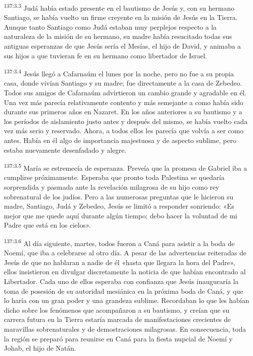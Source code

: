 \par
\textsuperscript{137:3.3} Judá había estado presente en el bautismo de Jesús y, con su hermano Santiago, se había vuelto un firme creyente en la misión de Jesús en la Tierra. Aunque tanto Santiago como Judá estaban muy perplejos respecto a la naturaleza de la misión de su hermano, su madre había resucitado todas sus antiguas esperanzas de que Jesús sería el Mesías, el hijo de David, y animaba a sus hijos a que tuvieran fe en su hermano como libertador de Israel.

\par
\textsuperscript{137:3.4} Jesús llegó a Cafarnaúm el lunes por la noche, pero no fue a su propia casa, donde vivían Santiago y su madre; fue directamente a la casa de Zebedeo. Todos sus amigos de Cafarnaúm advirtieron un cambio grande y agradable en él. Una vez más parecía relativamente contento y más semejante a como había sido durante sus primeros años en Nazaret. En los años anteriores a su bautismo y a los períodos de aislamiento justo antes y después del mismo, se había vuelto cada vez más serio y reservado. Ahora, a todos ellos les parecía que volvía a ser como antes. Había en él algo de importancia majestuosa y de aspecto sublime, pero estaba nuevamente desenfadado y alegre.

\par
\textsuperscript{137:3.5} María se estremecía de esperanza. Preveía que la promesa de Gabriel iba a cumplirse próximamente. Esperaba que pronto toda Palestina se quedaría sorprendida y pasmada ante la revelación milagrosa de su hijo como rey sobrenatural de los judíos. Pero a las numerosas preguntas que le hicieron su madre, Santiago, Judá y Zebedeo, Jesús se limitó a responder sonriendo: «Es mejor que me quede aquí durante algún tiempo; debo hacer la voluntad de mi Padre que está en los cielos».

\par
\textsuperscript{137:3.6} Al día siguiente, martes, todos fueron a Caná para asistir a la boda de Noemí, que iba a celebrarse al otro día. A pesar de las advertencias reiteradas de Jesús de que no hablaran a nadie de él «hasta que llegara la hora del Padre», ellos insistieron en divulgar discretamente la noticia de que habían encontrado al Libertador. Cada uno de ellos esperaba con confianza que Jesús inauguraría la toma de posesión de su autoridad mesiánica en la próxima boda de Caná, y que lo haría con un gran poder y una grandeza sublime. Recordaban lo que les habían dicho sobre los fenómenos que acompañaron a su bautismo, y creían que su carrera futura en la Tierra estaría marcada de manifestaciones crecientes de maravillas sobrenaturales y de demostraciones milagrosas. En consecuencia, toda la región se preparó para reunirse en Caná para la fiesta nupcial de Noemí y Johab, el hijo de Natán.

